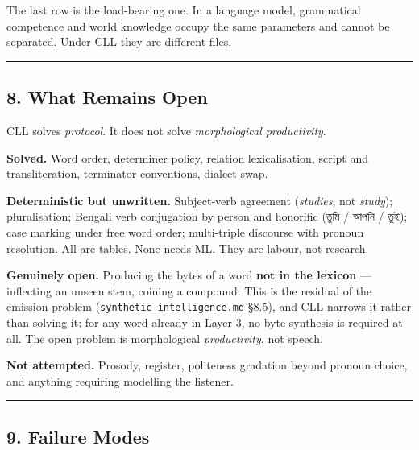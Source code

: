\documentclass[
  11pt,
  a4paper,
]{article}
\begin{document}
The last row is the load-bearing one. In a language model, grammatical
competence and world knowledge occupy the same parameters and cannot be
separated. Under CLL they are different files.

\begin{center}\rule{0.5\linewidth}{0.5pt}\end{center}

\subsection{8. What Remains Open}\label{what-remains-open}

CLL solves \emph{protocol}. It does not solve \emph{morphological
productivity}.

\textbf{Solved.} Word order, determiner policy, relation lexicalisation,
script and transliteration, terminator conventions, dialect swap.

\textbf{Deterministic but unwritten.} Subject-verb agreement
(\emph{studies}, not \emph{study}); pluralisation; Bengali verb
conjugation by person and honorific (তুমি / আপনি / তুই); case marking
under free word order; multi-triple discourse with pronoun resolution.
All are tables. None needs ML. They are labour, not research.

\textbf{Genuinely open.} Producing the bytes of a word \textbf{not in
the lexicon} --- inflecting an unseen stem, coining a compound. This is
the residual of the emission problem (\texttt{synthetic-intelligence.md}
§8.5), and CLL narrows it rather than solving it: for any word already
in Layer 3, no byte synthesis is required at all. The open problem is
morphological \emph{productivity}, not speech.

\textbf{Not attempted.} Prosody, register, politeness gradation beyond
pronoun choice, and anything requiring modelling the listener.

\begin{center}\rule{0.5\linewidth}{0.5pt}\end{center}

\subsection{9. Failure Modes}\label{failure-modes}
\end{document}
